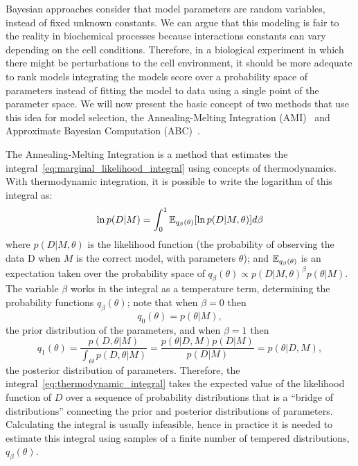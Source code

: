 Bayesian approaches consider that model parameters are random variables, 
instead of fixed unknown constants. We can argue that this modeling is 
fair to the reality in biochemical processes because interactions 
constants can vary depending on the cell conditions. Therefore, in a 
biological experiment in which there might be perturbations to the cell 
environment, it should be more adequate to rank models integrating the 
models score over a probability space of parameters instead of fitting 
the model to data using a single point of the parameter space. We will 
now present the basic concept of two methods that use this idea for 
model selection, the Annealing-Melting Integration 
(AMI)~\cite{Vyshemirsky2007} and Approximate Bayesian Computation 
(ABC)~\cite{Toni2009}.

The Annealing-Melting Integration is a method that estimates the 
integral~\ref{eq:marginal_likelihood_integral} using concepts of 
thermodynamics. With thermodynamic integration, it is possible to write 
the logarithm of this integral as:
\begin{equation}
        \ln p(D|M) 
            = \int_0^1 \mathbb{E}_{q_\beta(\theta)} 
              [\ln p(D | M, \theta)] d\beta
        \label{eq:thermodynamic_integral}
\end{equation}
where $p(D|M,\theta)$ is the likelihood function (the 
probability of observing the data D when $M$ is the correct model, with
parameters $\theta$); and $\mathbb{E}_{q_\beta (\theta)}$ is an 
expectation taken over the probability space of $q_\beta(\theta) 
\propto p(D|M, \theta)^\beta p(\theta|M)$. The 
variable $\beta$ works in the integral as a temperature term, 
determining the probability functions $q_{\beta}(\theta)$; note that 
when $\beta = 0$ then 
\begin{equation*}
q_0(\theta) = p(\theta|M),
\end{equation*}
the prior distribution of the parameters, and when 
$\beta = 1$ then 
\begin{equation*}
    q_1(\theta) = \frac{p(D, \theta| M)} {\int_{\Theta}
                            p(D, \theta| M)} 
                = \frac{p(\theta | D, M)p(D|M)} 
                        {p(D | M)}
                = p(\theta | D, M),
\end{equation*}
the posterior distribution of parameters. Therefore, the 
integral~\ref{eq:thermodynamic_integral} takes the expected value of the
likelihood function of $D$ over a sequence of probability distributions
that is a ``bridge of distributions'' connecting the prior and posterior 
distributions of parameters. Calculating the integral is usually 
infeasible, hence in practice it is needed to estimate this integral 
using samples of a finite number of tempered distributions, 
$q_\beta(\theta)$.

